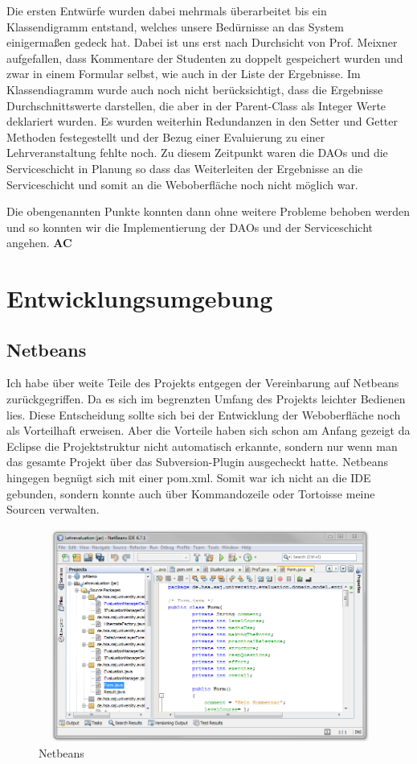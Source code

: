 \documentclass[titlepage, 12pt,a4paper]{scrartcl}
\begin{document}
Die ersten Entwürfe wurden dabei mehrmals überarbeitet bis ein Klassendigramm
entstand, welches unsere Bedürnisse an das System einigermaßen gedeck hat.
Dabei ist uns erst nach Durchsicht von Prof. Meixner aufgefallen, dass
Kommentare der Studenten zu doppelt gespeichert wurden und zwar in einem
Formular selbst, wie auch in der Liste der Ergebnisse. Im
Klassendiagramm wurde auch noch nicht berücksichtigt, dass die Ergebnisse
Durchschnittswerte darstellen, die aber in der Parent-Class als Integer Werte
deklariert wurden. Es wurden weiterhin Redundanzen in den Setter und Getter
Methoden festegestellt und der Bezug einer Evaluierung zu einer
Lehrveranstaltung fehlte noch. Zu diesem Zeitpunkt waren die DAOs und die
Serviceschicht in Planung so dass das Weiterleiten der Ergebnisse an die
Serviceschicht und somit an die Weboberfläche noch nicht möglich war. 

Die obengenannten Punkte konnten dann ohne weitere Probleme behoben werden und
so konnten wir die Implementierung der DAOs und der Serviceschicht angehen. 
{\bf{AC}}
\section{Entwicklungsumgebung}
\subsection{Netbeans}
Ich habe über weite Teile des Projekts entgegen der Vereinbarung auf Netbeans
zurückgegriffen. Da es sich im begrenzten Umfang des Projekts leichter Bedienen
lies. Diese Entscheidung sollte sich bei der Entwicklung der Weboberfläche
noch als Vorteilhaft erweisen. Aber die Vorteile haben sich schon am Anfang gezeigt
da Eclipse die Projektstruktur nicht automatisch erkannte, sondern nur wenn man
das gesamte Projekt über das Subversion-Plugin ausgecheckt hatte. Netbeans hingegen
begnügt sich mit einer pom.xml. Somit war ich nicht an die IDE gebunden, sondern konnte
auch über Kommandozeile oder Tortoisse meine Sourcen verwalten.

\begin{figure}[htb]
\begin{center}
\includegraphics[width=12cm, height=7cm]{bilder/Netbeans.PNG}
\caption{Netbeans}
\label{netbeans}
\end{center}
\end{figure}
\end{document}
